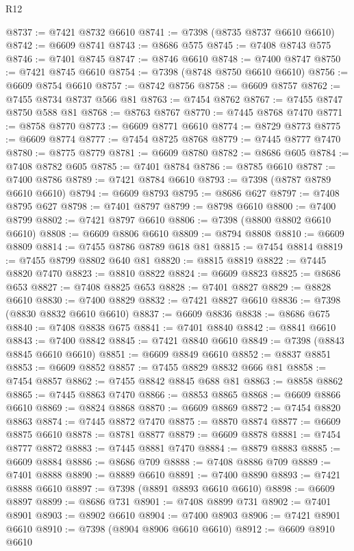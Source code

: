\begin{lexlean}{R12}
\begin{coremodule}
@8737 := @7421 @8732 @6610
@8741 := @7398 (@8735 @8737 @6610 @6610)
@8742 := @6609 @8741
@8743 := @8686 @575
@8745 := @7408 @8743 @575
@8746 := @7401 @8745
@8747 := @8746 @6610
@8748 := @7400 @8747
@8750 := @7421 @8745 @6610
@8754 := @7398 (@8748 @8750 @6610 @6610)
@8756 := @6609 @8754 @6610
@8757 := @8742 @8756
@8758 := @6609 @8757
@8762 := @7455 @8734 @8737 @566 @81
@8763 := @7454 @8762
@8767 := @7455 @8747 @8750 @588 @81
@8768 := @8763 @8767
@8770 := @7445 @8768 @7470
@8771 := @8758 @8770
@8773 := @6609 @8771 @6610
@8774 := @8729 @8773
@8775 := @6609 @8774
@8777 := @7454 @8725 @8768
@8779 := @7445 @8777 @7470
@8780 := @8775 @8779
@8781 := @6609 @8780
@8782 := @8686 @605
@8784 := @7408 @8782 @605
@8785 := @7401 @8784
@8786 := @8785 @6610
@8787 := @7400 @8786
@8789 := @7421 @8784 @6610
@8793 := @7398 (@8787 @8789 @6610 @6610)
@8794 := @6609 @8793
@8795 := @8686 @627
@8797 := @7408 @8795 @627
@8798 := @7401 @8797
@8799 := @8798 @6610
@8800 := @7400 @8799
@8802 := @7421 @8797 @6610
@8806 := @7398 (@8800 @8802 @6610 @6610)
@8808 := @6609 @8806 @6610
@8809 := @8794 @8808
@8810 := @6609 @8809
@8814 := @7455 @8786 @8789 @618 @81
@8815 := @7454 @8814
@8819 := @7455 @8799 @8802 @640 @81
@8820 := @8815 @8819
@8822 := @7445 @8820 @7470
@8823 := @8810 @8822
@8824 := @6609 @8823
@8825 := @8686 @653
@8827 := @7408 @8825 @653
@8828 := @7401 @8827
@8829 := @8828 @6610
@8830 := @7400 @8829
@8832 := @7421 @8827 @6610
@8836 := @7398 (@8830 @8832 @6610 @6610)
@8837 := @6609 @8836
@8838 := @8686 @675
@8840 := @7408 @8838 @675
@8841 := @7401 @8840
@8842 := @8841 @6610
@8843 := @7400 @8842
@8845 := @7421 @8840 @6610
@8849 := @7398 (@8843 @8845 @6610 @6610)
@8851 := @6609 @8849 @6610
@8852 := @8837 @8851
@8853 := @6609 @8852
@8857 := @7455 @8829 @8832 @666 @81
@8858 := @7454 @8857
@8862 := @7455 @8842 @8845 @688 @81
@8863 := @8858 @8862
@8865 := @7445 @8863 @7470
@8866 := @8853 @8865
@8868 := @6609 @8866 @6610
@8869 := @8824 @8868
@8870 := @6609 @8869
@8872 := @7454 @8820 @8863
@8874 := @7445 @8872 @7470
@8875 := @8870 @8874
@8877 := @6609 @8875 @6610
@8878 := @8781 @8877
@8879 := @6609 @8878
@8881 := @7454 @8777 @8872
@8883 := @7445 @8881 @7470
@8884 := @8879 @8883
@8885 := @6609 @8884
@8886 := @8686 @709
@8888 := @7408 @8886 @709
@8889 := @7401 @8888
@8890 := @8889 @6610
@8891 := @7400 @8890
@8893 := @7421 @8888 @6610
@8897 := @7398 (@8891 @8893 @6610 @6610)
@8898 := @6609 @8897
@8899 := @8686 @731
@8901 := @7408 @8899 @731
@8902 := @7401 @8901
@8903 := @8902 @6610
@8904 := @7400 @8903
@8906 := @7421 @8901 @6610
@8910 := @7398 (@8904 @8906 @6610 @6610)
@8912 := @6609 @8910 @6610

\end{coremodule}
\end{lexlean}
